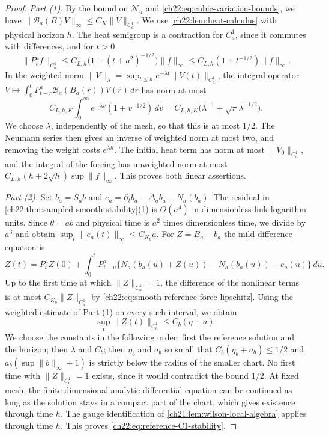 \begin{proof}
\emph{Part (1).} By the bound on $\mathcal N_a$ and \eqref{ch22:eq:cubic-variation-bounds}, we have $\|\mathscr B_a(B)V\|_\infty\le C_K\|V\|_{C_a^1}$. We use \cref{ch22:lem:heat-calculus} with physical horizon $h$. The heat semigroup is a contraction for $C_a^1$, since it commutes with differences, and for $t>0$
\[
 \|P_t^af\|_{C_a^1}\le C_{L,h}\bigl(1+(t+a^2)^{-1/2}\bigr)\|f\|_\infty\le C_{L,h}(1+t^{-1/2})\|f\|_\infty .
\]
In the weighted norm $\|V\|_\lambda=\sup_{t\le h}e^{-\lambda t}\|V(t)\|_{C_a^1}$, the integral operator $V\mapsto\int_0^tP^a_{t-r}\mathscr B_a(B_a(r))V(r)\,dr$ has norm at most
\[
 C_{L,h,K}\int_0^\infty e^{-\lambda v}(1+v^{-1/2})\,dv=C_{L,h,K}\bigl(\lambda^{-1}+\sqrt\pi\lambda^{-1/2}\bigr).
\]
We choose $\lambda$, independently of the mesh, so that this is at most $1/2$. The Neumann series then gives an inverse of weighted norm at most two, and removing the weight costs $e^{\lambda h}$. The initial heat term has norm at most $\|V_0\|_{C_a^1}$, and the integral of the forcing has unweighted norm at most $C_{L,h}(h+2\sqrt h)\sup\|f\|_\infty$. This proves both linear assertions.

\emph{Part (2).} Set $b_a=S_ab$ and $e_a=\partial_tb_a-\Delta_ab_a-N_a(b_a)$. The residual in \cref{ch22:thm:sampled-smooth-stability}(1) is $O(a^4)$ in dimensionless link-logarithm units. Since $\theta=ab$ and physical time is $a^2$ times dimensionless time, we divide by $a^3$ and obtain $\sup_t\|e_a(t)\|_\infty\le C_{K_b}a$. For $Z=B_a-b_a$ the mild difference equation is
\[
 Z(t)=P_t^aZ(0)+\int_0^tP_{t-u}^a\bigl\{N_a(b_a(u)+Z(u))-N_a(b_a(u))-e_a(u)\bigr\}\,du .
\]
Up to the first time at which $\|Z\|_{C_a^1}=1$, the difference of the nonlinear terms is at most $C_{K_b}\|Z\|_{C_a^1}$ by \eqref{ch22:eq:smooth-reference-force-lipschitz}. Using the weighted estimate of Part (1) on every such interval, we obtain
\[
 \sup_t\|Z(t)\|_{C_a^1}\le C_b(\eta+a).
\]
We choose the constants in the following order: first the reference solution and the horizon; then $\lambda$ and $C_b$; then $\eta_b$ and $a_b$ so small that $C_b(\eta_b+a_b)\le1/2$ and $a_b(\sup\|b\|_\infty+1)$ is strictly below the radius of the smaller chart. No first time with $\|Z\|_{C^1_a}=1$ exists, since it would contradict the bound $1/2$. At fixed mesh, the finite-dimensional analytic differential equation can be continued as long as the solution stays in a compact part of the chart, which gives existence through time $h$. The gauge identification of \cref{ch21:lem:wilson-local-algebra} applies through time $h$. This proves \eqref{ch22:eq:reference-C1-stability}.


\end{proof}
